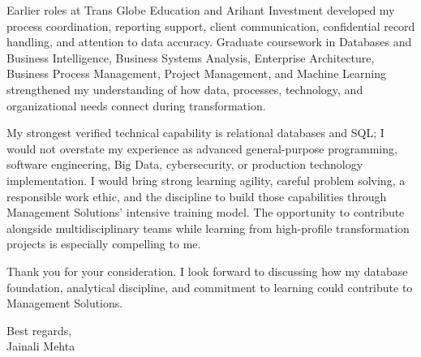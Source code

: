 \documentclass[letterpaper,11pt]{article}
\begin{document}
\bigbreak
Earlier roles at Trans Globe Education and Arihant Investment developed my process coordination, reporting support, client communication, confidential record handling, and attention to data accuracy. Graduate coursework in Databases and Business Intelligence, Business Systems Analysis, Enterprise Architecture, Business Process Management, Project Management, and Machine Learning strengthened my understanding of how data, processes, technology, and organizational needs connect during transformation.

\bigbreak
My strongest verified technical capability is relational databases and SQL; I would not overstate my experience as advanced general-purpose programming, software engineering, Big Data, cybersecurity, or production technology implementation. I would bring strong learning agility, careful problem solving, a responsible work ethic, and the discipline to build those capabilities through Management Solutions' intensive training model. The opportunity to contribute alongside multidisciplinary teams while learning from high-profile transformation projects is especially compelling to me.

\bigbreak
Thank you for your consideration. I look forward to discussing how my database foundation, analytical discipline, and commitment to learning could contribute to Management Solutions.

\bigbreak
Best regards,\\
Jainali Mehta
\end{document}
